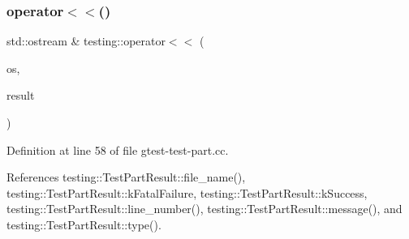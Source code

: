 \subsubsection{\texorpdfstring{operator$<$$<$()}{operator<<()}\hspace{0.1cm}{\footnotesize\ttfamily [1/2]}}
{\footnotesize\ttfamily std\+::ostream \& testing\+::operator$<$$<$ (\begin{DoxyParamCaption}\item[{std\+::ostream \&}]{os,  }\item[{const \hyperlink{classtesting_1_1TestPartResult}{Test\+Part\+Result} \&}]{result }\end{DoxyParamCaption})}



Definition at line 58 of file gtest-\/test-\/part.\+cc.



References testing\+::\+Test\+Part\+Result\+::file\+\_\+name(), testing\+::\+Test\+Part\+Result\+::k\+Fatal\+Failure, testing\+::\+Test\+Part\+Result\+::k\+Success, testing\+::\+Test\+Part\+Result\+::line\+\_\+number(), testing\+::\+Test\+Part\+Result\+::message(), and testing\+::\+Test\+Part\+Result\+::type().


